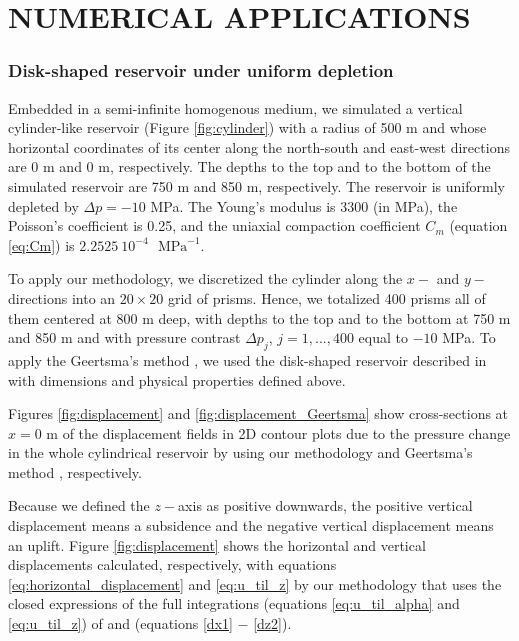 \documentclass[journal abbreviation, manuscript]{copernicus}
\begin{document}
\section{NUMERICAL APPLICATIONS}

\subsubsection{Disk-shaped reservoir under uniform depletion}

Embedded in a semi-infinite homogenous medium, we simulated a vertical cylinder-like reservoir (Figure \ref{fig:cylinder}) with a radius of 500 m and whose horizontal coordinates of its center along the north-south and east-west directions are 0 m and 0 m, respectively.
The depths to the top and to the bottom of the simulated reservoir are 750 m and 850 m, respectively.
The reservoir is uniformly depleted by $\Delta p = -10$ MPa. 
The Young’s modulus is  3300 (in MPa), the Poisson's coefficient is 0.25, and
the uniaxial compaction coefficient $C_{m}$  (equation \ref{eq:Cm}) is $2.2525 \: 10^{-4}$
$\textrm{ MPa}^{-1}$.



To apply our methodology, we  discretized the cylinder  along the $x-$ and $y-$ directions into an $20 \times 20$ grid of prisms. Hence, we totalized 400 prisms all of them centered at 800 m deep, with depths to the top and to the bottom at 750 m and 850 m  and with pressure contrast $\Delta p_j$, $j = 1, ..., 400$ equal to $-10$ MPa.
To apply the Geertsma’s method \citep{Geertsma73}, we used the disk-shaped reservoir described in \cite{Fjaer08} with dimensions and physical properties defined above.
 
Figures \ref{fig:displacement}  and \ref{fig:displacement_Geertsma}  show cross-sections at 
$x  = 0$ m of the displacement fields in 2D contour plots  due to the pressure change in the whole  cylindrical reservoir by using our methodology and Geertsma’s method \citep{Geertsma73}, respectively.

Because we defined the $z-$axis as positive downwards, the positive vertical displacement means a subsidence and the negative vertical displacement means an uplift.
Figure \ref{fig:displacement}  shows the horizontal and vertical displacements  calculated, respectively, with equations \ref{eq:horizontal_displacement} and \ref{eq:u_til_z} by our methodology that uses the closed expressions of the full integrations (equations \ref{eq:u_til_alpha} and \ref{eq:u_til_z}) of \cite{Nagyetal2000} and \cite{Nagyetal2002} (equations \ref{dx1} $-$ \ref{dz2}).
\end{document}

